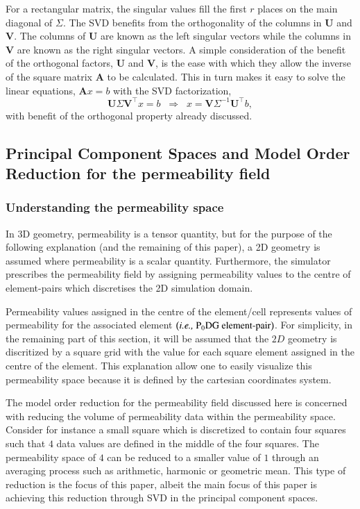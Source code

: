 \documentclass[preprint,12pt]{elsarticle}
\newcommand{\ie}{{\it i.e., }}
\begin{document}
\medskip
For a rectangular matrix, the singular values fill the first $r$ places on the main diagonal of $\Sigma$. The SVD benefits from the orthogonality of the columns in $\mathbf{U}$ and $\mathbf{V}$. The columns of $\mathbf{U}$ are known as the left singular vectors while the columns in $\mathbf{V}$ are known as the right singular vectors. A simple consideration of the benefit of the orthogonal factors, $\mathbf{U}$ and $\mathbf{V}$, is the ease with which they allow the inverse of the square matrix $\mathbf{A}$ to be calculated. This in turn makes it easy to solve the linear equations, $\mathbf{A}x = b$ with the SVD factorization,
\begin{equation}\label{e:SVD_factorization}
 \mathbf{U} \Sigma \mathbf{V}^{\intercal} x = b \;\;\Longrightarrow\;\; x = \mathbf{V} \Sigma^{-1} \mathbf{U}^{\intercal} b,
\end{equation} 
with benefit of the orthogonal property already discussed.


\subsection{Principal Component Spaces and Model Order Reduction for the permeability field}\label{subsection:pcspaces}
  
\subsubsection{Understanding the permeability space}\label{subsubsection:visualization_permspace}
In 3D geometry, permeability is a tensor quantity, but for the purpose of the following explanation (and the remaining of this paper), a 2D geometry is assumed where permeability is a scalar quantity. Furthermore, the simulator prescribes the permeability field by assigning permeability values to the centre of element-pairs \cite{Christou_2018} which discretises the 2D simulation domain.

Permeability values assigned in the centre of the element/cell represents values of permeability for the associated element $\left(\text{\ie P}_{0}\text{DG element-pair}\right)$. For simplicity, in the remaining part of this section, it will be assumed that the $2D$ geometry is discritized by a square grid with the value for each square element assigned in the centre of the element. This explanation allow one to easily visualize this permeability space because it is defined by the cartesian coordinates system.

The model order reduction for the permeability field discussed here is concerned with reducing the volume of permeability data within the permeability space. Consider for instance a small square which is discretized to contain four squares such that $4$ data values are defined in the middle of the four squares. The permeability space of $4$ can be reduced to a smaller value of $1$ through an averaging process such as arithmetic, harmonic or geometric mean. This type of reduction is the focus of this paper, albeit the main focus of this paper is achieving this reduction through SVD in the principal component spaces. 
\end{document}
